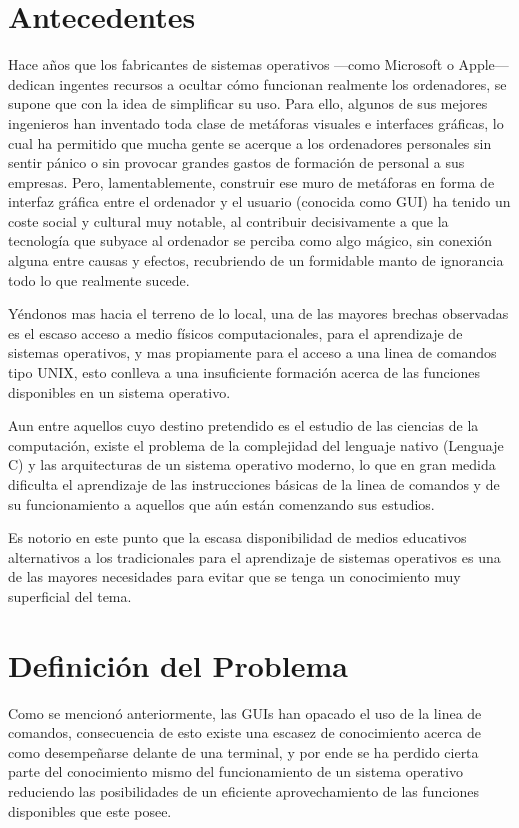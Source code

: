 \documentclass[letterpaper,11pt]{article}
\begin{document}
\section{Antecedentes}
Hace años que los fabricantes de sistemas operativos —como Microsoft o Apple—
dedican ingentes recursos a ocultar cómo funcionan realmente los ordenadores,
se supone que con la idea de simplificar su uso. Para ello, algunos de sus
mejores ingenieros han inventado toda clase de metáforas visuales e interfaces
gráficas, lo cual ha permitido que mucha gente se acerque a los ordenadores
personales sin sentir pánico o sin provocar grandes gastos de formación de
personal a sus empresas. Pero, lamentablemente, construir ese muro de
metáforas en forma de interfaz gráfica entre el ordenador y el usuario
(conocida como GUI) ha tenido un coste social y cultural muy notable, al
contribuir decisivamente a que la tecnología que subyace al ordenador se
perciba como algo mágico, sin conexión alguna entre causas y efectos,
recubriendo de un formidable manto de ignorancia todo lo que realmente
sucede.\cite{Stephenson}

Yéndonos mas hacia el terreno de lo local, una de las mayores brechas
observadas es el escaso acceso a medio físicos computacionales, para el
aprendizaje de sistemas operativos, y mas propiamente para el acceso a una
linea de comandos tipo UNIX, esto conlleva a una insuficiente formación acerca
de las funciones disponibles en un sistema operativo.

Aun entre aquellos cuyo destino pretendido es el estudio de las ciencias de la
computación, existe el problema de la complejidad del lenguaje nativo
(Lenguaje C) y las arquitecturas de un sistema operativo moderno, lo que en
gran medida dificulta el aprendizaje de las instrucciones básicas de la linea
de comandos y de su funcionamiento a aquellos que aún están comenzando sus
estudios.

Es notorio en este punto que la escasa disponibilidad de medios educativos
alternativos a los tradicionales para el aprendizaje de sistemas operativos es
una de las mayores necesidades para evitar que se tenga un conocimiento muy
superficial del tema.

\section{Definición del Problema}
Como se mencionó anteriormente, las GUIs han opacado el uso de la linea de
comandos, consecuencia de esto existe una escasez de conocimiento acerca de
como desempeñarse delante de una terminal, y por ende se ha perdido cierta
parte del conocimiento mismo del funcionamiento de un sistema operativo
reduciendo las posibilidades de un eficiente aprovechamiento de las funciones
disponibles que este posee.
\end{document}
